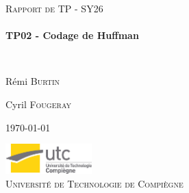 \begin{titlepage}
\begin{center}



\textsc{\Large Rapport de TP - SY26}\\[0.5cm]
\vspace{4cm}
\HRule \\[0.4cm]
{ \huge \bfseries TP02 - Codage de Huffman \\[0.4cm] }

\HRule \\[1.5cm]

\begin{minipage}{0.4\textwidth}
\begin{flushleft} \large
R\'emi \textsc{Burtin}
\end{flushleft}
\end{minipage}
\begin{minipage}{0.4\textwidth}
\begin{flushright} \large
Cyril \textsc{Fougeray}
\end{flushright}
\end{minipage}

\vspace{4cm}

{\large \today}



\vfill
\includegraphics[width=0.25\textwidth]{logo.jpg}\\[0.5cm]

\textsc{\LARGE Universit\'{e} de Technologie de Compi\`{e}gne}\\[1.5cm]


\end{center}
\end{titlepage}
